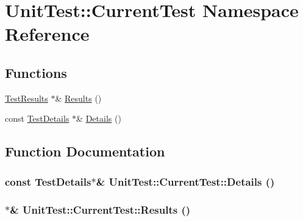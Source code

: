 \hypertarget{namespace_unit_test_1_1_current_test}{
\section{UnitTest::CurrentTest Namespace Reference}
\label{namespace_unit_test_1_1_current_test}
}
\subsection*{Functions}
\begin{CompactItemize}
\item 
\hyperlink{class_unit_test_1_1_test_results}{TestResults} $\ast$\& \hyperlink{namespace_unit_test_1_1_current_test_df6fab2abe58df8bae299760bb4abf46}{Results} ()
\item 
const \hyperlink{class_unit_test_1_1_test_details}{TestDetails} $\ast$\& \hyperlink{namespace_unit_test_1_1_current_test_ce40742ec38b456697e34ee45988755e}{Details} ()
\end{CompactItemize}


\subsection{Function Documentation}
\hypertarget{namespace_unit_test_1_1_current_test_ce40742ec38b456697e34ee45988755e}{
\subsubsection[{Details}]{\setlength{\rightskip}{0pt plus 5cm}const {\bf TestDetails}$\ast$\& UnitTest::CurrentTest::Details ()}}
\label{namespace_unit_test_1_1_current_test_ce40742ec38b456697e34ee45988755e}


\hypertarget{namespace_unit_test_1_1_current_test_df6fab2abe58df8bae299760bb4abf46}{
\subsubsection[{Results}]{$\ast$\& UnitTest::CurrentTest::Results ()}}
\label{namespace_unit_test_1_1_current_test_df6fab2abe58df8bae299760bb4abf46}


